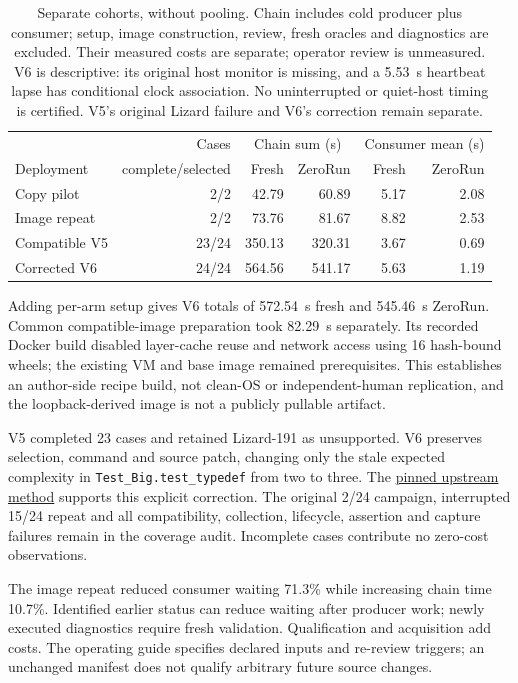 \documentclass[preprint,12pt,a4paper]{elsarticle}
\newcommand{\code}[1]{\texttt{#1}}
\begin{document}
\begin{table}[htbp]\centering\small
\begin{tabular}{@{}lrrrrr@{}}\toprule
 & Cases & \multicolumn{2}{c}{Chain sum (s)} & \multicolumn{2}{c}{Consumer mean (s)} \\
Deployment & complete/selected & Fresh & ZeroRun & Fresh & ZeroRun \\
\midrule
Copy pilot & 2/2 & 42.79 & 60.89 & 5.17 & 2.08 \\
Image repeat & 2/2 & 73.76 & 81.67 & 8.82 & 2.53 \\
Compatible V5 & 23/24 & 350.13 & 320.31 & 3.67 & 0.69 \\
Corrected V6 & 24/24 & 564.56 & 541.17 & 5.63 & 1.19 \\
\bottomrule\end{tabular}
\caption{Separate cohorts, without pooling. Chain includes cold producer plus consumer; setup, image construction, review, fresh oracles and diagnostics are excluded. Their measured costs are separate; operator review is unmeasured. V6 is descriptive: its original host monitor is missing, and a 5.53~s heartbeat lapse has conditional clock association. No uninterrupted or quiet-host timing is certified. V5's original Lizard failure and V6's correction remain separate.}
\label{tab:handoffs}\end{table}

Adding per-arm setup gives V6 totals of 572.54~s fresh and 545.46~s ZeroRun. Common compatible-image preparation took 82.29~s separately. Its recorded Docker build disabled layer-cache reuse and network access using 16 hash-bound wheels; the existing VM and base image remained prerequisites. This establishes an author-side recipe build, not clean-OS or independent-human replication, and the loopback-derived image is not a publicly pullable artifact.

V5 completed 23 cases and retained Lizard-191 as unsupported. V6 preserves selection, command and source patch, changing only the stale expected complexity in \code{Test\_Big.test\_typedef} from two to three. The \href{https://github.com/terryyin/lizard/blob/67d87968e9fecd459c9a9a1dcb01cf6ceac5721d/test/test_languages/testCAndCPP.py#L685}{pinned upstream method} supports this explicit correction. The original 2/24 campaign, interrupted 15/24 repeat and all compatibility, collection, lifecycle, assertion and capture failures remain in the coverage audit. Incomplete cases contribute no zero-cost observations.

The image repeat reduced consumer waiting 71.3\% while increasing chain time 10.7\%. Identified earlier status can reduce waiting after producer work; newly executed diagnostics require fresh validation. Qualification and acquisition add costs. The operating guide specifies declared inputs and re-review triggers; an unchanged manifest does not qualify arbitrary future source changes.
\end{document}
